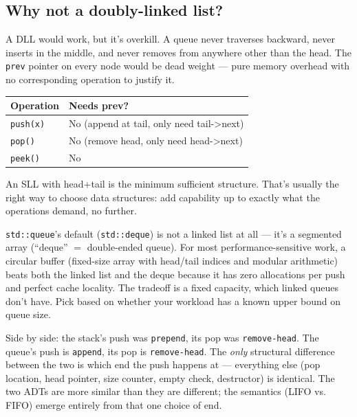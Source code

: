 \documentclass[11pt]{article}
\begin{document}
\subsection*{Why not a doubly-linked list?}

A DLL would work, but it's overkill. A queue never traverses
backward, never inserts in the middle, and never removes from
anywhere other than the head. The \texttt{prev} pointer on every
node would be dead weight --- pure memory overhead with no
corresponding operation to justify it.

\begin{center}
\begin{tabular}{|l|l|}
\hline
\textbf{Operation} & \textbf{Needs prev?} \\
\hline
\texttt{push(x)}   & No (append at tail, only need tail->next) \\
\texttt{pop()}     & No (remove head, only need head->next) \\
\texttt{peek()}    & No \\
\hline
\end{tabular}
\end{center}

An SLL with head+tail is the minimum sufficient structure. That's
usually the right way to choose data structures: add capability
up to exactly what the operations demand, no further.

\begin{notebox}
\texttt{std::queue}'s default (\texttt{std::deque}) is not a
linked list at all --- it's a segmented array (``deque'' $=$
double-ended queue). For most performance-sensitive work, a
circular buffer (fixed-size array with head/tail indices and
modular arithmetic) beats both the linked list and the deque
because it has zero allocations per push and perfect cache
locality. The tradeoff is a fixed capacity, which linked queues
don't have. Pick based on whether your workload has a known upper
bound on queue size.
\end{notebox}

\begin{ideabox}
Side by side: the stack's push was \texttt{prepend}, its pop was
\texttt{remove-head}. The queue's push is \texttt{append}, its
pop is \texttt{remove-head}. The \emph{only} structural
difference between the two is which end the push happens at ---
everything else (pop location, head pointer, size counter, empty
check, destructor) is identical. The two ADTs are more similar
than they are different; the semantics (LIFO vs. FIFO) emerge
entirely from that one choice of end.
\end{ideabox}
\end{document}

